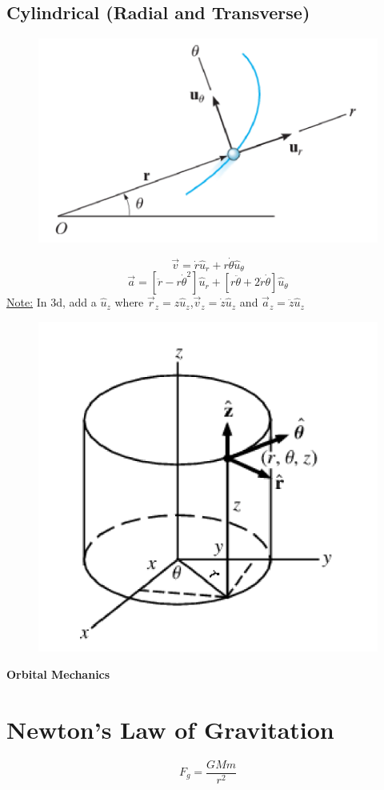 \documentclass[10pt, fleqn]{article}
\begin{document}
\begin{multicols}{2}
\section*{Cylindrical (Radial and Transverse)}
\begin{figure}[H]
    \includegraphics[width=0.3 \textwidth]{cylindrical.png}
\end{figure}
\[\vec{v}=\dot{r}\hat{u}_r+r\dot{\theta}\hat{u}_{\theta}\]
\[\vec{a}=\left[\ddot{r}-r\dot{\theta}^2\right]\hat{u}_r+\left[r\ddot{\theta}+2\dot{r}\dot{\theta}\right]\hat{u}_{\theta}\]
\underline{Note:} In 3d, add a $\hat{u}_z$ where $\vec{r}_z=z\hat{u}_z$,$\vec{v}_z=\dot{z}\hat{u}_z$ and $\vec{a}_z=\ddot{z}\hat{u}_z$
\begin{figure}[H]
    \includegraphics[width=0.3 \textwidth]{3d cylindrical.png}
\end{figure}
\end{multicols}
\newpage
\makeatletter
\@fleqnfalse
\makeatother

\begin{center}
    \Large \textbf{Orbital Mechanics}
\end{center}
\section*{Newton's Law of Gravitation}
\[F_g=\frac{GMm}{r^2}\]
\end{document}

